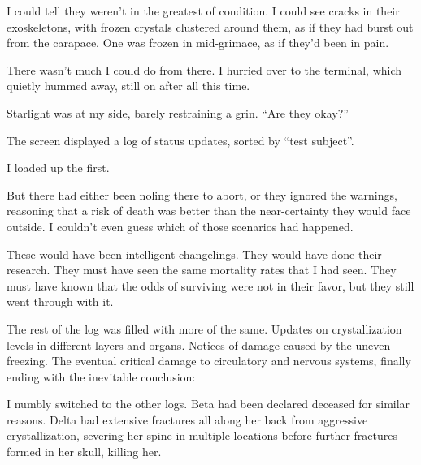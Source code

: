 I could tell they weren’t in the greatest of condition. I could see cracks in their exoskeletons, with frozen crystals clustered around them, as if they had burst out from the carapace. One was frozen in mid-grimace, as if they’d been in pain.

There wasn’t much I could do from there. I hurried over to the terminal, which quietly hummed away, still on after all this time.

Starlight was at my side, barely restraining a grin. “Are they okay?”

The screen displayed a log of status updates, sorted by “test subject”.

I loaded up the first.


But there had either been noling there to abort, or they ignored the warnings, reasoning that a risk of death was better than the near-certainty they would face outside. I couldn’t even guess which of those scenarios had happened.

These would have been intelligent changelings. They would have done their research. They must have seen the same mortality rates that I had seen. They must have known that the odds of surviving were not in their favor, but they still went through with it.

The rest of the log was filled with more of the same. Updates on crystallization levels in different layers and organs. Notices of damage caused by the uneven freezing. The eventual critical damage to circulatory and nervous systems, finally ending with the inevitable conclusion:


I numbly switched to the other logs. Beta had been declared deceased for similar reasons. Delta had extensive fractures all along her back from aggressive crystallization, severing her spine in multiple locations before further fractures formed in her skull, killing her.


